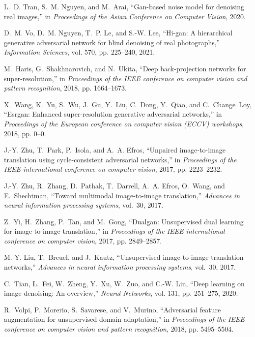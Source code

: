 \documentclass[lettersize,journal]{IEEEtran}
\begin{document}
\begin{thebibliography}{10}
L.~D. Tran, S.~M. Nguyen, and M.~Arai, ``Gan-based noise model for denoising
  real images,'' in \emph{Proceedings of the Asian Conference on Computer
  Vision}, 2020.

D.~M. Vo, D.~M. Nguyen, T.~P. Le, and S.-W. Lee, ``Hi-gan: A hierarchical
  generative adversarial network for blind denoising of real photographs,''
  \emph{Information Sciences}, vol. 570, pp. 225--240, 2021.

M.~Haris, G.~Shakhnarovich, and N.~Ukita, ``Deep back-projection networks for
  super-resolution,'' in \emph{Proceedings of the IEEE conference on computer
  vision and pattern recognition}, 2018, pp. 1664--1673.

X.~Wang, K.~Yu, S.~Wu, J.~Gu, Y.~Liu, C.~Dong, Y.~Qiao, and C.~Change~Loy,
  ``Esrgan: Enhanced super-resolution generative adversarial networks,'' in
  \emph{Proceedings of the European conference on computer vision (ECCV)
  workshops}, 2018, pp. 0--0.

J.-Y. Zhu, T.~Park, P.~Isola, and A.~A. Efros, ``Unpaired image-to-image
  translation using cycle-consistent adversarial networks,'' in
  \emph{Proceedings of the IEEE international conference on computer vision},
  2017, pp. 2223--2232.

J.-Y. Zhu, R.~Zhang, D.~Pathak, T.~Darrell, A.~A. Efros, O.~Wang, and
  E.~Shechtman, ``Toward multimodal image-to-image translation,''
  \emph{Advances in neural information processing systems}, vol.~30, 2017.

Z.~Yi, H.~Zhang, P.~Tan, and M.~Gong, ``Dualgan: Unsupervised dual learning for
  image-to-image translation,'' in \emph{Proceedings of the IEEE international
  conference on computer vision}, 2017, pp. 2849--2857.

M.-Y. Liu, T.~Breuel, and J.~Kautz, ``Unsupervised image-to-image translation
  networks,'' \emph{Advances in neural information processing systems},
  vol.~30, 2017.

C.~Tian, L.~Fei, W.~Zheng, Y.~Xu, W.~Zuo, and C.-W. Lin, ``Deep learning on
  image denoising: An overview,'' \emph{Neural Networks}, vol. 131, pp.
  251--275, 2020.

R.~Volpi, P.~Morerio, S.~Savarese, and V.~Murino, ``Adversarial feature
  augmentation for unsupervised domain adaptation,'' in \emph{Proceedings of
  the IEEE conference on computer vision and pattern recognition}, 2018, pp.
  5495--5504.


\end{thebibliography}
\end{document}
